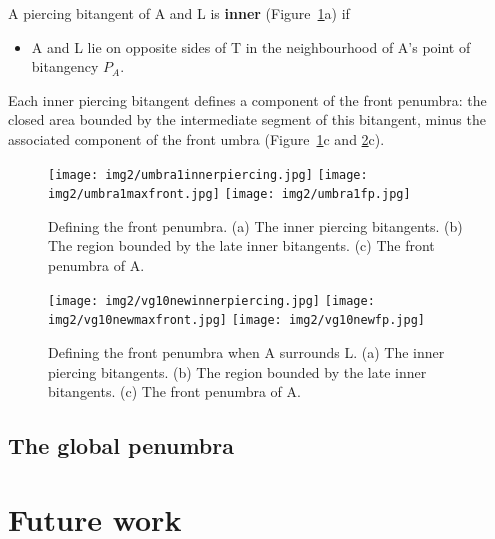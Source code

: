 \documentclass[9pt,twocolumn]{article}
\begin{document}
\begin{defn2}
A piercing bitangent of A and L is {\bf inner} (Figure~\ref{fig:frontpenumbra}a) if
\begin{itemize}
\item A and L lie on opposite sides of T in the neighbourhood of A's point of bitangency $P_A$.
\end{itemize}
\end{defn2}

Each inner piercing bitangent defines a component of the front penumbra:
the closed area bounded by the intermediate segment of this bitangent,
minus the associated component of the front umbra (Figure~\ref{fig:frontpenumbra}c and 
\ref{fig:frontpenumbrasurrounding}c).

\begin{figure}
\begin{center}
\texttt{[image: img2/umbra1innerpiercing.jpg]}
\texttt{[image: img2/umbra1maxfront.jpg]}
\texttt{[image: img2/umbra1fp.jpg]}
\end{center}
\caption{Defining the front penumbra. 
         (a) The inner piercing bitangents.
         (b) The region bounded by the late inner bitangents.
         (c) The front penumbra of A.}
\label{fig:frontpenumbra}
\end{figure}

\begin{figure}
\begin{center}
\texttt{[image: img2/vg10newinnerpiercing.jpg]}
\texttt{[image: img2/vg10newmaxfront.jpg]}
\texttt{[image: img2/vg10newfp.jpg]}
\end{center}
\caption{Defining the front penumbra when A surrounds L. 
         (a) The inner piercing bitangents.
         (b) The region bounded by the late inner bitangents.
         (c) The front penumbra of A.}
\label{fig:frontpenumbrasurrounding}
\end{figure}

\subsection{The global penumbra}

\clearpage

\section{Future work}
\end{document}
